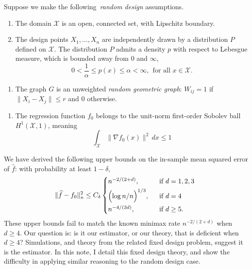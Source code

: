 \documentclass{article}
\newcommand{\1}{\mathbf{1}}
\newcommand{\Xset}{\mathcal{X}}
\newcommand{\wh}[1]{\widehat{#1}}
\theoremstyle{definition}
\theoremstyle{remark}
\begin{document}
Suppose we make the following~\emph{random design} assumptions.
\begin{enumerate}[label=(P\arabic*)]
	\item
	\label{asmp:domain}
	 The domain $\Xset$ is an open, connected set, with Lipschitz boundary.
	\item 
	\label{asmp:density}
	The design points $X_1,\ldots,X_n$ are independently drawn by a distribution $P$ defined on $\Xset$. The distribution $P$ admits a density $p$ with respect to Lebesgue measure, which is bounded away from $0$ and $\infty$,
	\begin{equation*}
	0 < \frac{1}{\alpha} \leq p(x) \leq \alpha < \infty,~~\textrm{for all $x \in \Xset$.}
	\end{equation*}
\end{enumerate}
\begin{enumerate}[label=(G\arabic*)]
	\item 
	\label{asmp:geometric_graph}
	The graph $G$ is an unweighted \emph{random geometric graph}: $W_{ij} = 1$ if $\|X_i - X_j\| \leq r$ and $0$ otherwise.
\end{enumerate}
\begin{enumerate}[label=(F\arabic*)]
	\item 
	\label{asmp:sobolev_norm}
	The regression function $f_0$ belongs to the unit-norm first-order Sobolev ball $H^1(\Xset,1)$, meaning
	\begin{equation}
	\label{eqn:sobolev_norm}
	\int_{\Xset} \|\nabla f_0(x)\|^2 \,dx \leq 1
	\end{equation}
\end{enumerate}
We have derived the following upper bounds on the in-sample mean squared error of $\wh{f}$: with probability at least $1 - \delta$,
\begin{equation*}
\|\wh{f} - f_0\|_n^2 \leq C_{\delta}
\begin{cases*}
n^{-2/(2 + d)},& ~~\textrm{if $d = 1,2,3$} \\
\Bigl(\log n/n\Bigr)^{1/3},&~~\textrm{if $d = 4$} \\
n^{-4/(3d)},& ~~\textrm{if $d \geq 5$.}
\end{cases*}
\end{equation*}
These upper bounds fail to match the known minimax rate $n^{-2/(2 + d)}$ when $d \geq 4$. Our question is: is it our estimator, or our theory, that is deficient when $d \geq 4$? Simulations, and theory from the related fixed design problem, suggest it is the estimator. In this note, I detail this fixed design theory, and show the difficulty in applying similar reasoning to the random design case.
\end{document}
